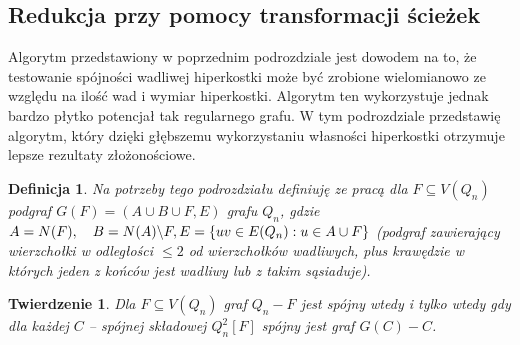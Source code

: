 \documentclass{pracamgr}
\newtheorem{defi}{Definicja}[section] %
\newtheorem{theorem}{Twierdzenie}
\begin{document}
   \subsection{Redukcja przy pomocy transformacji ścieżek}
    Algorytm przedstawiony w poprzednim podrozdziale jest dowodem na to, że testowanie spójności wadliwej hiperkostki może być zrobione wielomianowo
    ze względu na ilość wad i wymiar hiperkostki. Algorytm ten wykorzystuje jednak bardzo płytko potencjał tak regularnego grafu.
    W tym podrozdziale przedstawię algorytm, który dzięki głębszemu wykorzystaniu własności hiperkostki otrzymuje lepsze rezultaty złożonościowe.
    \begin{defi}\label{podgrafy kostki}
     Na potrzeby tego podrozdziału definiuję ze pracą \cite{DFGKR} dla $F\subseteq V(Q_n)$\newline
     podgraf $G(F)=(A\cup B\cup F,E)$ grafu $Q_n$,
     gdzie $A=N(F),\quad B=N(A)\backslash F,\newline E=\{uv\in E(Q_n):u\in A\cup F\}$ (podgraf zawierający wierzchołki w odległości $\le 2$ od wierzchołków wadliwych,
     plus krawędzie w których jeden z końców jest wadliwy lub z takim sąsiaduje).
    \end{defi}
    \begin{theorem}\label{spojnosc z lokalnej spojnosci}
     Dla $F\subseteq V(Q_n)$ graf $Q_n-F$ jest spójny wtedy i tylko wtedy gdy dla każdej $C$ -- spójnej składowej $Q_n^2[F]$ spójny jest graf $G(C)-C$.
    \end{theorem}
\end{document}
